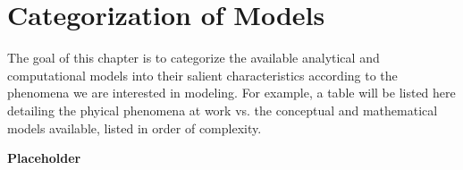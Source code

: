 \chapter{Categorization of Models}\label{ch:categorization}
The goal of this chapter is to categorize the available analytical and 
computational models into their salient characteristics according to the 
phenomena we are interested in modeling. For example, a table will be listed 
here detailing the phyical phenomena at work vs. the conceptual and 
mathematical models available, listed in order of complexity.


\textbf{Placeholder}
